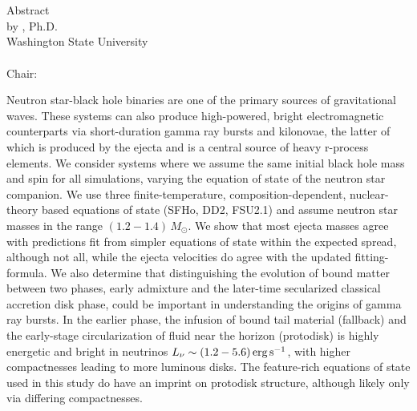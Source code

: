 \label{chap:chapter-1}

\begin{center}
	\begin{singlespace}
		\label{ssec:abstract}

		\MakeUppercase{\mytitleA}\\
    	\bigskip
    	\MakeUppercase{\mytitleB}\\
		\bigskip
		Abstract\\
		\bigskip \bigskip \bigskip
		by \myname, Ph.D.\\
		Washington State University\\
		\, \currentyear \\
		\bigskip \bigskip \bigskip
		Chair: \mychair	
	\end{singlespace}
\end{center}
  

Neutron star-black hole binaries are one of the primary sources of 
gravitational waves.  
These systems can also produce high-powered,
bright electromagnetic counterparts via short-duration gamma
ray bursts and kilonovae, the latter of which is produced by the ejecta and is a central source of heavy r-process elements.
We consider systems where we assume the same initial black hole mass
and spin for all simulations, varying the equation of state of the neutron
star companion.
We use three finite-temperature, composition-dependent, nuclear-theory based
equations of state (SFHo, DD2, FSU2.1) and assume neutron star masses
in the range $(1.2 - 1.4)\,M_\odot$.
We show that most ejecta masses agree with predictions fit from simpler 
equations of state within the expected spread, although not all, while the ejecta velocities do agree with the 
updated fitting-formula.
We also determine that distinguishing the evolution of bound matter between two phases, early admixture and the later-time secularized classical accretion disk phase,
could be important in understanding the origins of 
gamma ray bursts.
In the earlier phase, the infusion of bound tail material (fallback) and the early-stage circularization of fluid near the horizon (protodisk) is highly energetic and bright in neutrinos \mbox{$L_{\nu} \sim (1.2 - 5.6)\,{\rm erg\,s}^{-1}$}, with higher compactnesses leading to more luminous disks.
The feature-rich equations of state used in this study do have an imprint on protodisk structure, although likely only via differing compactnesses.


\newpage